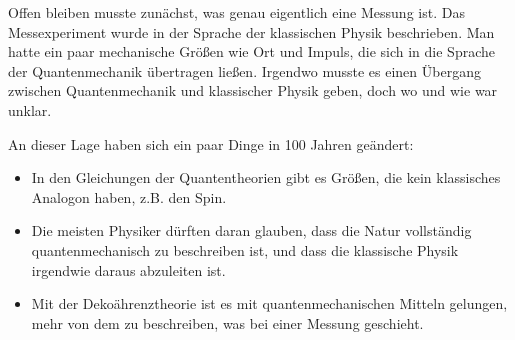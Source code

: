 \documentclass[12pt]{article}
\begin{document}
Offen bleiben musste zunächst, was genau eigentlich eine Messung ist. Das Messexperiment wurde in der Sprache der klassischen Physik beschrieben. Man hatte ein paar mechanische Größen wie Ort und Impuls, die sich in die Sprache der Quantenmechanik übertragen ließen. Irgendwo musste es einen Übergang zwischen Quantenmechanik und klassischer Physik geben, doch wo und wie war unklar.

An dieser Lage haben sich ein paar Dinge in 100 Jahren geändert:
\begin{itemize}
\item In den Gleichungen der Quantentheorien gibt es Größen, die kein klassisches Analogon haben, z.B. den Spin. 
\item Die meisten Physiker dürften daran glauben, dass die Natur vollständig quantenmechanisch zu beschreiben ist, und dass die klassische Physik irgendwie daraus abzuleiten ist.
\item Mit der Dekoährenztheorie ist es mit quantenmechanischen Mitteln gelungen, mehr von dem zu beschreiben, was bei einer Messung geschieht.
\end{itemize}
\end{document}

